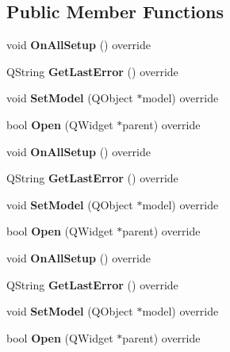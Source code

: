 \subsection*{Public Member Functions}
\begin{DoxyCompactItemize}
\item 
\mbox{\label{class_task_list_view_a8d3b2873b6d944aa2a0146a1b855e4ae}} 
void {\bfseries On\+All\+Setup} () override
\item 
\mbox{\label{class_task_list_view_af853529bf8207791465cb624c51f4850}} 
Q\+String {\bfseries Get\+Last\+Error} () override
\item 
\mbox{\label{class_task_list_view_a4f0f460ebfe6cef171b0434047ea9df3}} 
void {\bfseries Set\+Model} (Q\+Object $\ast$model) override
\item 
\mbox{\label{class_task_list_view_ac621ebd978d94c696aa0636560c4ea39}} 
bool {\bfseries Open} (Q\+Widget $\ast$parent) override
\item 
\mbox{\label{class_task_list_view_a8d3b2873b6d944aa2a0146a1b855e4ae}} 
void {\bfseries On\+All\+Setup} () override
\item 
\mbox{\label{class_task_list_view_af853529bf8207791465cb624c51f4850}} 
Q\+String {\bfseries Get\+Last\+Error} () override
\item 
\mbox{\label{class_task_list_view_a4f0f460ebfe6cef171b0434047ea9df3}} 
void {\bfseries Set\+Model} (Q\+Object $\ast$model) override
\item 
\mbox{\label{class_task_list_view_ac621ebd978d94c696aa0636560c4ea39}} 
bool {\bfseries Open} (Q\+Widget $\ast$parent) override
\item 
\mbox{\label{class_task_list_view_a8d3b2873b6d944aa2a0146a1b855e4ae}} 
void {\bfseries On\+All\+Setup} () override
\item 
\mbox{\label{class_task_list_view_af853529bf8207791465cb624c51f4850}} 
Q\+String {\bfseries Get\+Last\+Error} () override
\item 
\mbox{\label{class_task_list_view_a4f0f460ebfe6cef171b0434047ea9df3}} 
void {\bfseries Set\+Model} (Q\+Object $\ast$model) override
\item 
\mbox{\label{class_task_list_view_ac621ebd978d94c696aa0636560c4ea39}} 
bool {\bfseries Open} (Q\+Widget $\ast$parent) override
\end{DoxyCompactItemize}


